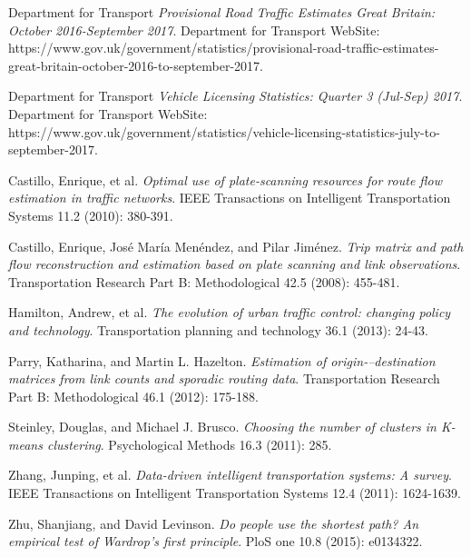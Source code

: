 \documentclass[twoside,leqno,twocolumn]{article}
\begin{document}






\begin{thebibliography}{99}

Department for Transport {\em Provisional Road Traffic Estimates Great Britain: October 2016-September 2017}. Department for Transport WebSite: https://www.gov.uk/government/statistics/provisional-road-traffic-estimates-great-britain-october-2016-to-september-2017.

Department for Transport {\em Vehicle Licensing Statistics: Quarter 3 (Jul-Sep) 2017}. Department for Transport WebSite: https://www.gov.uk/government/statistics/vehicle-licensing-statistics-july-to-september-2017.

Castillo, Enrique, et al. {\em Optimal use of plate-scanning resources for route flow estimation in traffic networks}. IEEE Transactions on Intelligent Transportation Systems 11.2 (2010): 380-391.

Castillo, Enrique, José María Menéndez, and Pilar Jiménez. {\em Trip matrix and path flow reconstruction and estimation based on plate scanning and link observations}. Transportation Research Part B: Methodological 42.5 (2008): 455-481.

Hamilton, Andrew, et al. {\em The evolution of urban traffic control: changing policy and technology}. Transportation planning and technology 36.1 (2013): 24-43.

Parry, Katharina, and Martin L. Hazelton. {\em Estimation of origin-–destination matrices from link counts and sporadic routing data}. Transportation Research Part B: Methodological 46.1 (2012): 175-188.

Steinley, Douglas, and Michael J. Brusco. {\em Choosing the number of clusters in Κ-means clustering}. Psychological Methods 16.3 (2011): 285.

Zhang, Junping, et al. {\em Data-driven intelligent transportation systems: A survey}. IEEE Transactions on Intelligent Transportation Systems 12.4 (2011): 1624-1639.

Zhu, Shanjiang, and David Levinson. {\em Do people use the shortest path? An empirical test of Wardrop’s first principle}. PloS one 10.8 (2015): e0134322.


%

\end{thebibliography}
\end{document}
